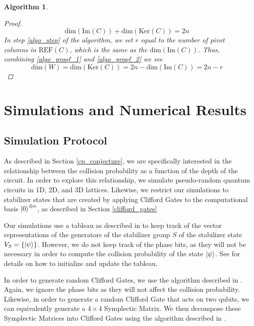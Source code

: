 \message{ !name(report_1.tex)}\documentclass[11pt]{article}
\newtheorem{algorithm}{Algorithm}
\theoremstyle{definition}
\theoremstyle{plain}
\begin{document}
\begin{algorithm}
\begin{proof}
\begin{equation}\label{algo_proof_2}
\text{dim}({\text{Im}(C)}) + \text{dim}(\text{Ker}(C)) = 2n
\end{equation}
In step {\ref{algo_step}} of the algorithm, we set $r$ equal to the number of pivot columns in $\text{REF}(C)$, which is the same as the $\text{dim}(\text{Im}(C))$. Thus, combining {\ref{algo_proof_1}} and {\ref{algo_proof_2}} we see 
\begin{equation}
  \text{dim}(W) = \text{dim}(\text{Ker}(C)) = 2n - \text{dim}({\text{Im}(C)})
  = 2n - r
\end{equation}
\end{proof}
\end{algorithm}


\section{Simulations and Numerical Results}

\subsection{Simulation Protocol}
As described in Section {\ref{cp_conjecture}}, we are specifically interested in the relationship between the collision probability as a function of the depth of the circuit. In order to explore this relationship, we simulate pseudo-random quantum circuits in 1D, 2D, and 3D lattices. Likewise, we restrict our simulations to stabilizer states that are created by applying Clifford Gates to the computational basis $\ket{0}^{\otimes n}$, as described in Section {\ref{clifford_gates}}

Our simulations use a tableau as described in {\cite{aaronson}} to keep track of the vector representations of the generators of the stabilizer group $S$ of the stabilizer state $V_S = \{ \ket{\psi} \}$. However, we do not keep track of the phase bits, as they will not be necessary in order to compute the collision probability of the state $\ket{\psi}$. See {\cite{aaronson}} for details on how to initialize and update the tableau. 

In order to generate random Clifford Gates, we use the algorithm described in {\cite{random_clifford}}. Again, we ignore the phase bits as they will not affect the collision probability. Likewise, in order to generate a random Clifford Gate that acts on two qubits, we can equivalently generate a $4 \times 4$ Symplectic Matrix. We then decompose these Symplectic Matrices into Clifford Gates using the algorithm described in {\cite{aaronson}}.
\end{document}
